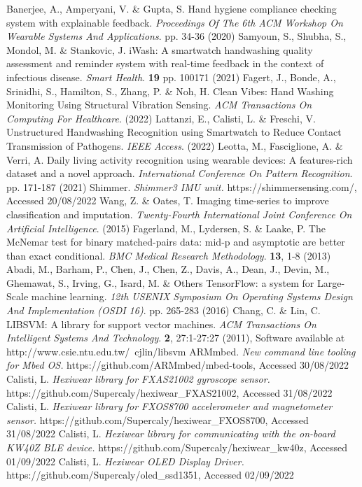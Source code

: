 \begin{thebibliography}{99}
    Banerjee, A., Amperyani, V. \& Gupta, S. Hand hygiene compliance checking system with explainable feedback. {\em Proceedings Of The 6th ACM Workshop On Wearable Systems And Applications}. pp. 34-36 (2020)
    Samyoun, S., Shubha, S., Mondol, M. \& Stankovic, J. iWash: A smartwatch handwashing quality assessment and reminder system with real-time feedback in the context of infectious disease. {\em Smart Health}. \textbf{19} pp. 100171 (2021)
    Fagert, J., Bonde, A., Srinidhi, S., Hamilton, S., Zhang, P. \& Noh, H. Clean Vibes: Hand Washing Monitoring Using Structural Vibration Sensing. {\em ACM Transactions On Computing For Healthcare}. (2022)
    Lattanzi, E., Calisti, L. \& Freschi, V. Unstructured Handwashing Recognition using Smartwatch to Reduce Contact Transmission of Pathogens. {\em IEEE Access}. (2022)
    Leotta, M., Fasciglione, A. \& Verri, A. Daily living activity recognition using wearable devices: A features-rich dataset and a novel approach. {\em International Conference On Pattern Recognition}. pp. 171-187 (2021)
    Shimmer. {\em Shimmer3 IMU unit.} https://shimmersensing.com/, Accessed 20/08/2022
    Wang, Z. \& Oates, T. Imaging time-series to improve classification and imputation. {\em Twenty-Fourth International Joint Conference On Artificial Intelligence}. (2015)
    Fagerland, M., Lydersen, S. \& Laake, P. The McNemar test for binary matched-pairs data: mid-p and asymptotic are better than exact conditional. {\em BMC Medical Research Methodology}. \textbf{13}, 1-8 (2013)
    Abadi, M., Barham, P., Chen, J., Chen, Z., Davis, A., Dean, J., Devin, M., Ghemawat, S., Irving, G., Isard, M. \& Others {TensorFlow}: a system for {Large-Scale} machine learning. {\em 12th USENIX Symposium On Operating Systems Design And Implementation (OSDI 16)}. pp. 265-283 (2016)
    Chang, C. \& Lin, C. LIBSVM: A library for support vector machines. {\em ACM Transactions On Intelligent Systems And Technology}. \textbf{2}, 27:1-27:27 (2011), Software available at http://www.csie.ntu.edu.tw/~cjlin/libsvm
    ARMmbed. {\em New command line tooling for Mbed OS.} https://github.com/ARMmbed/mbed-tools, Accessed 30/08/2022
    Calisti, L. {\em Hexiwear library for FXAS21002 gyroscope sensor.} https://github.com/Supercaly/hexiwear\_FXAS21002, Accessed 31/08/2022
    Calisti, L. {\em Hexiwear library for FXOS8700 accelerometer and magnetometer sensor.} https://github.com/Supercaly/hexiwear\_FXOS8700, Accessed 31/08/2022
    Calisti, L. {\em Hexiwear library for communicating with the on-board KW40Z BLE device.} https://github.com/Supercaly/hexiwear\_kw40z, Accessed 01/09/2022
    Calisti, L. {\em Hexiwear OLED Display Driver.} https://github.com/Supercaly/oled\_ssd1351, Accessed 02/09/2022
\end{thebibliography}